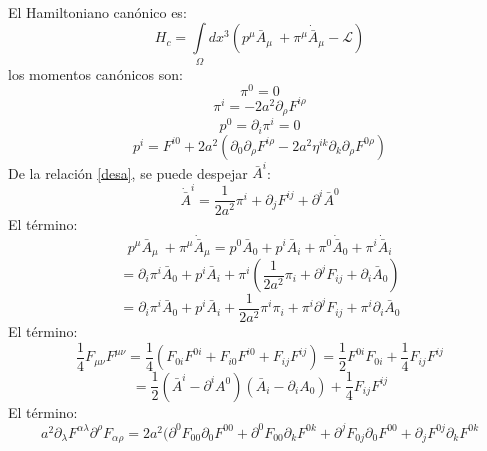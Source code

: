 \documentclass[a4paper,12pt]{article}
\begin{document}
\\

El Hamiltoniano canónico es:
\begin{equation}
H_c=\int\limits_{\Omega}dx^{3}\left(p^{\mu}\bar{A}_\mu\ +\pi^{\mu}\dot{\bar{ A}}_\mu-\mathscr{L}\right)
\end{equation}
los momentos canónicos son:
\begin{equation}
\pi^0=0   
\end{equation}
\begin{equation}
 \pi^i=-2a^2\partial_\rho F^{i\rho} 
\label{desa} 
\end{equation}
\begin{equation}
p^0=\partial_i \pi^i=0     
\end{equation}
\begin{equation}
p^i=F^{i0}+2a^2(\partial_0\partial_\rho F^{i\rho}-2a^2\eta^{ik}\partial_k\partial_\rho F^{0\rho}) 
\end{equation}
De la relación \eqref{desa}, se puede despejar $\bar{ A}^i$:
\begin{equation}
\dot{\bar{ A}}^i=\frac{1}{2a^2}\pi^i+\partial_j F^{ij}+\partial^i\bar{ A}^0
\end{equation}
El término:
\begin{equation}
p^{\mu}\bar{A}_\mu\ +\pi^{\mu}\dot{\bar{ A}}_\mu=p^{0}\bar{A}_0+p^{i}\bar{A}_i +\pi^{0}\dot{\bar{ A}}_0+\pi^{i}\dot{\bar{ A}}_i 
\end{equation}
$$=\partial_i \pi^i\bar{A}_0+p^{i}\bar{A}_i +\pi^{i}(\frac{1}{2a^2}\pi_i+\partial^j F_{ij}+\partial_i\bar{ A}_0) 
$$
$$=\partial_i \pi^i\bar{A}_0+p^{i}\bar{A}_i +\frac{1}{2a^2}\pi^{i}\pi_i+\pi^{i}\partial^j F_{ij}+\pi^{i}\partial_i\bar{ A}_0 
$$
El término:
\begin{equation}
\frac{1}{4} F_{\mu \nu}F^{\mu \nu}=\frac{1}{4}\left( F_{0i}F^{0i}+ F_{i0}F^{i0}+ F_{ij}F^{ij} \right)= \frac{1}{2} F^{0i}F_{0i}+\frac{1}{4} F_{ij}F^{ij}
\end{equation}
$$=\frac{1}{2}(\bar{A}^i-\partial^i A^0)(\bar{A}_i-\partial_i A_0)+\frac{1}{4} F_{ij}F^{ij}$$
El término:
\begin{equation}
a^2\partial_\lambda F^{\alpha\lambda}\partial^\rho F_{\alpha\rho}=2a^2(\partial^0 F_{00}\partial_0 F^{00}+\partial^0 F_{00}\partial_k F^{0k}+\partial^j F_{0j}\partial_0 F^{00}+\partial_j F^{0j}\partial_k F^{0k} 
\end{equation}  
\end{document}
